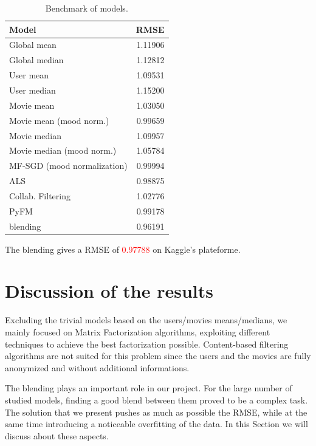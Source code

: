 \documentclass[10pt,conference,compsocconf]{IEEEtran}
\begin{document}
\begin{table}[htbp]
\centering
\begin{tabular}[c]{| l r |}
\hline
Model & RMSE \\
\hline 
\hline
Global mean			& 1.11906 \\
Global median			& 1.12812 \\
User mean			& 1.09531 \\
User median			& 1.15200 \\
Movie mean			& 1.03050 \\
Movie mean (mood norm.)		& 0.99659 \\
Movie median			& 1.09957 \\
Movie median (mood norm.)	& 1.05784 \\
MF-SGD (mood normalization)	& 0.99994 \\
ALS				& 0.98875 \\
Collab. Filtering		& 1.02776 \\
PyFM				& 0.99178 \\ \hline\hline
blending			& 0.96191 \\ 
\hline
\end{tabular}
  \caption{Benchmark of models.}
  \label{benchmark}
\end{table}

The blending gives a RMSE of \textcolor{red}{0.97788} on Kaggle's plateforme. 

\section{Discussion of the results}

Excluding the trivial models based on the users/movies means/medians, we mainly focused on Matrix
Factorization algorithms, exploiting different techniques to achieve the best factorization
possible. Content-based filtering algorithms are not suited for this problem since the users and the
movies are fully anonymized and without additional informations.

The blending plays an important role in our project. For the large number of studied models,
finding a good blend between them proved to be a complex task. The solution that we present pushes
as much as possible the RMSE, while at the same time introducing a noticeable overfitting of the
data.
In this Section we will discuss about these aspects.

\end{document}
